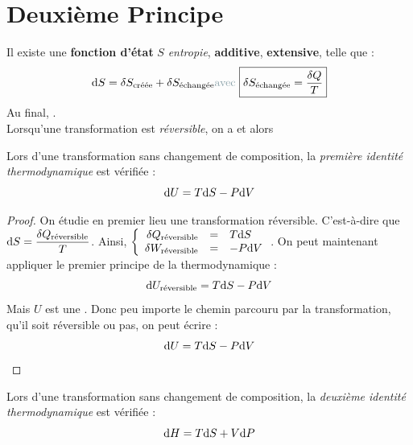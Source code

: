 \documentclass[11pt,a4paper,fleqn,pdftex]{report}
\begin{document}
\section{Deuxième Principe}
\begin{itheorem}
Il existe une \textbf{fonction d'état} $S$ \emph{entropie}, \textbf{additive}, \textbf{extensive}, telle que : 
\begin{equation}\label{SecondPrincipe}
\d S = \delta S_\text{créée} + \delta S_\text{échangée}\\
\text{\textcolor{couleurFonce!50}{avec }}\boxed{\delta S_\text{échangée} = \dfrac{\delta Q}{T}}
\end{equation}
Au final, . \\
Lorsqu'une transformation est \emph{réversible}, on a  et alors 
\end{itheorem}
%
\begin{itheorem}
   Lors d'une transformation sans changement de composition, la \emph{première identité thermodynamique} est vérifiée : 
   \begin{equation}\label{eq:premiere_identite_thermo}
   \mathrm{d} U = T\mathrm{d} S - P\mathrm{d} V
   \end{equation}
\end{itheorem}
\begin{proof}
   On étudie en premier lieu une transformation réversible. C'est-à-dire que $\mathrm{d} S = \dfrac{\delta Q_\text{réversible}}{T}$. \newline
   Ainsi, $\left\lbrace\begin{array}{r c l}
      \delta Q_\text{réversible} &=& T\mathrm{d} S \\
      \delta W_\text{réversible} &=& -P\mathrm{d} V
   \end{array}\right.$. On peut maintenant appliquer le premier principe de la thermodynamique : 
   \[
     \mathrm{d} U_\text{réversible} = T\mathrm{d} S - P\mathrm{d} V
   \]
   Mais $U$ est une . Donc peu importe le chemin parcouru par la transformation, qu'il soit réversible ou pas, on peut écrire : 
   \[
     \mathrm{d} U = T\mathrm{d} S - P\mathrm{d} V
   \]
\end{proof}
\begin{theorem}
   Lors d'une transformation sans changement de composition, la \emph{deuxième identité thermodynamique} est vérifiée : 
   \begin{equation}\label{eq:deuxieme_identite_thermo}
   \mathrm{d} H = T\mathrm{d} S + V\mathrm{d} P
   \end{equation}
\end{theorem}
\end{document}
